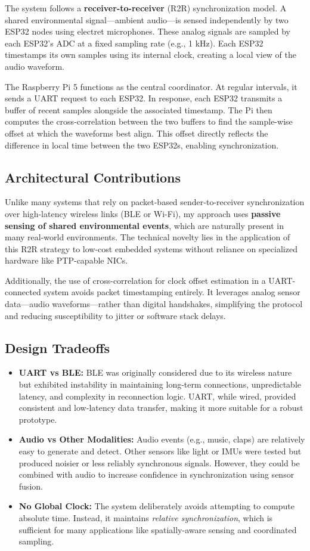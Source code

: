 \documentclass[sigconf]{acmart}
\begin{document}
The system follows a \textbf{receiver-to-receiver} (R2R) synchronization model. A shared environmental signal—ambient audio—is sensed independently by two ESP32 nodes using electret microphones. These analog signals are sampled by each ESP32’s ADC at a fixed sampling rate (e.g., 1 kHz). Each ESP32 timestamps its own samples using its internal clock, creating a local view of the audio waveform.

The Raspberry Pi 5 functions as the central coordinator. At regular intervals, it sends a UART request to each ESP32. In response, each ESP32 transmits a buffer of recent samples alongside the associated timestamp. The Pi then computes the cross-correlation between the two buffers to find the sample-wise offset at which the waveforms best align. This offset directly reflects the difference in local time between the two ESP32s, enabling synchronization.

\subsection{Architectural Contributions}
Unlike many systems that rely on packet-based sender-to-receiver synchronization over high-latency wireless links (BLE or Wi-Fi), my approach uses \textbf{passive sensing of shared environmental events}, which are naturally present in many real-world environments. The technical novelty lies in the application of this R2R strategy to low-cost embedded systems without reliance on specialized hardware like PTP-capable NICs.

Additionally, the use of cross-correlation for clock offset estimation in a UART-connected system avoids packet timestamping entirely. It leverages analog sensor data—audio waveforms—rather than digital handshakes, simplifying the protocol and reducing susceptibility to jitter or software stack delays.

\subsection{Design Tradeoffs}
\begin{itemize}
    \item \textbf{UART vs BLE:} BLE was originally considered due to its wireless nature but exhibited instability in maintaining long-term connections, unpredictable latency, and complexity in reconnection logic. UART, while wired, provided consistent and low-latency data transfer, making it more suitable for a robust prototype.
    \item \textbf{Audio vs Other Modalities:} Audio events (e.g., music, claps) are relatively easy to generate and detect. Other sensors like light or IMUs were tested but produced noisier or less reliably synchronous signals. However, they could be combined with audio to increase confidence in synchronization using sensor fusion.
    \item \textbf{No Global Clock:} The system deliberately avoids attempting to compute absolute time. Instead, it maintains \textit{relative synchronization}, which is sufficient for many applications like spatially-aware sensing and coordinated sampling.
\end{itemize}
\end{document}
